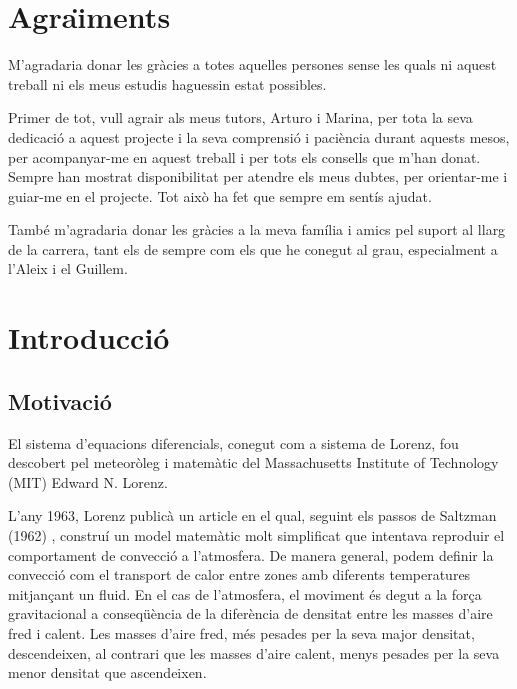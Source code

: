 \documentclass[11pt,a4paper,openright,oneside]{article}
\numberwithin{equation}{section}
\theoremstyle{definition}
\begin{document}
\section*{Agra\"{\i}ments}

M’agradaria donar les gràcies a totes aquelles persones sense les quals ni aquest treball
ni els meus estudis haguessin estat possibles.

Primer de tot, vull agrair als meus tutors, Arturo i Marina, per tota la seva dedicació a aquest projecte i la seva comprensió i paciència durant aquests mesos, per acompanyar-me en aquest treball i per tots els consells que m'han donat. Sempre han mostrat disponibilitat per atendre els meus dubtes, per orientar-me i guiar-me en el projecte. Tot això ha fet que sempre em sentís ajudat. 

També m’agradaria donar les gràcies a la meva família i amics pel suport al llarg de la carrera, tant els de sempre com els que he conegut al grau, especialment a l'Aleix i el Guillem.   

\newpage

\tableofcontents

\newpage

\setcounter{page}{1}
\section{Introducci\'o}
\subsection{Motivació} 
El sistema d'equacions diferencials, conegut com a sistema de Lorenz, fou descobert pel meteoròleg i matemàtic del Massachusetts Institute of Technology (MIT) Edward N. Lorenz. 

L'any 1963, Lorenz publicà un article \cite{Lorenz} en el qual, seguint els passos de Saltzman (1962) \cite{Saltzman}, construí un model matemàtic molt simplificat que intentava reproduir el comportament de convecció a l'atmosfera. De manera general, podem definir la convecció com el transport de calor entre zones amb diferents temperatures mitjançant un fluid. En el cas de l'atmosfera, el moviment és degut a la força gravitacional a conseqüència de la diferència de densitat entre les masses d'aire fred i calent. Les masses d'aire fred, més pesades per la seva major densitat, descendeixen, al contrari que les masses d'aire calent, menys pesades per la seva menor densitat que ascendeixen. 
\end{document}
